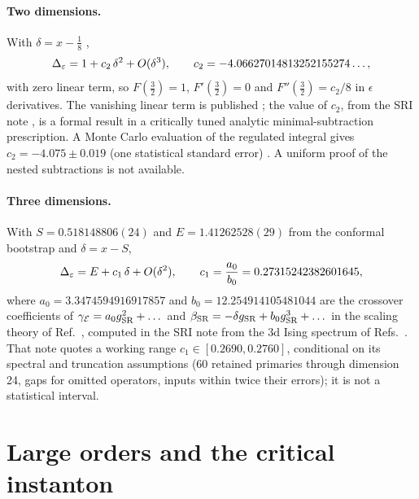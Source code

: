 \paragraph{Two dimensions.} With $\delta=x-\frac18$ \cite{rs:Behan:2017emf,rs:noteSRI},
\begin{equation}
 \Delta_\varepsilon=1+c_2\,\delta^2+O(\delta^3),\qquad c_2=-4.06627014813252155274\ldots,
 \label{rs:eq:sr2}
\end{equation}
with zero linear term, so $F(\frac32)=1$, $F'(\frac32)=0$ and $F''(\frac32)=c_2/8$ in
$\epsilon$ derivatives. The vanishing linear term is published \cite{rs:Behan:2017emf}; the
value of $c_2$, from the SRI note \cite{rs:noteSRI}, is a formal result in a critically tuned
analytic minimal-subtraction prescription. A Monte Carlo evaluation of the regulated integral
gives $c_2=-4.075\pm0.019$ (one statistical standard error) \cite{rs:noteSRI}. A uniform proof
of the nested subtractions is not available.

\paragraph{Three dimensions.} With $S=0.518148806(24)$ and $E=1.41262528(29)$ from the
conformal bootstrap \cite{rs:Chang:2024whx} and $\delta=x-S$,
\begin{equation}
 \Delta_\varepsilon=E+c_1\,\delta+O(\delta^2),\qquad c_1=\frac{a_0}{b_0}=0.27315242382601645,
 \label{rs:eq:sr3}
\end{equation}
where $a_0=3.3474594916917857$ and $b_0=12.254914105481044$ are the crossover
coefficients of $\gamma_{\mathcal E}=a_0g_{\rm SR}^2+\dots$ and
$\beta_{\rm SR}=-\delta g_{\rm SR}+b_0g_{\rm SR}^3+\dots$ in the scaling theory of
Ref.~\cite{rs:Behan:2017emf}, computed in the SRI note \cite{rs:noteSRI} from the 3d Ising
spectrum of Refs.~\cite{rs:Simmons-Duffin:2016wlq,rs:Chang:2024whx}. That note quotes a working
range $c_1\in[0.2690,0.2760]$, conditional on its spectral and truncation assumptions (60
retained primaries through dimension 24, gaps for omitted operators, inputs within twice
their errors); it is not a statistical interval.

\section{Large orders and the critical instanton}\label{rs:sec:largeorder}
